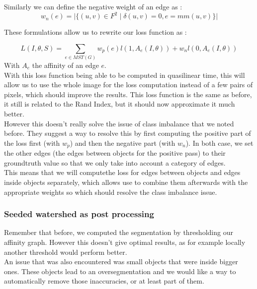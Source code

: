 Similarly we can define the negative weight of an edge as :
\begin{equation*}
	w_n(e)=\lvert \{(u,v)\in F^2 \;|\;\delta(u,v)=0, e=mm(u,v) \}   \rvert
\end{equation*}

These formulations allow us to rewrite our loss function as :

\begin{equation*}
	L(I,\theta,S) = \sum_{e\in MST(G)} w_p(e)l(1,A_e(I,\theta)) + w_nl(0,A_e(I,\theta))
\end{equation*}
With $A_e$ the affinity of an edge $e$.\\

With this loss function being able to be computed in quasilinear time, this
will allow us to use the whole image for the loss computation instead of a few
pairs of pixels, which should improve the results. This loss function is the
same as before, it still is related to the Rand Index, but it should now
approximate it much better.\\


However this doesn't really solve the issue of class imbalance that we noted
before. They suggest a way to resolve this by first computing the positive part
of the loss first (with $w_p$) and then the negative part (with $w_n$). In both
case, we set the other edges (the edges between objects for the positive pass)
to their groundtruth value so that we only take into account a category of
edges.\\
This means that we will computethe loss for edges between objects and edges
inside objects separately, which allows use to combine them afterwards with the
appropriate weights so which should resolve the class imbalance issue.

\subsubsection{Seeded watershed as post processing}

Remember that before, we computed the segmentation by thresholding our affinity
graph. However this doesn't give optimal results, as for example locally
another threshold would perform better.\\
An issue that was also encountered was small objects that were inside bigger
ones. These objects lead to an oversegmentation and we would like a way to
automatically remove those inaccuracies, or at least part of them.

